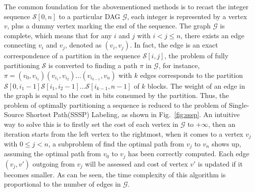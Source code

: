 \documentclass[runningheads,a4paper]{llncs}
\begin{document}
The common foundation for the abovementioned methods is to recast the integer sequence $\mathcal{S} \left[ 0, n \right]$ to a particular DAG $\mathcal{G}$, each integer is represented by a vertex $ v $, plus a dummy vertex marking the end of the sequence.
The graph $\mathcal{G}$ is complete, which means that for any $i$ and $j$ with $i < j \leqslant n$, there exists an edge connecting $v_{i}$ and $v_{j}$, denoted as $\left( v_{i}, v_{j} \right)$.
In fact, the edge is an exact correspondence of a partition in the sequence $\mathcal{S}\left[i, j \right] $, the problem of fully partitioning $\mathcal{S}$ is converted to finding a path $\pi$ in $\mathcal{G}$, for instance, $\pi=\left( v_{0}, v_{i_{1}} \right) \left( v_{i_{1}}, v_{i_{2}} \right)\ldots\left( v_{i_{k-1}}, v_{n} \right)$ with $k$ edges corresponds to the partition $\mathcal{S}\left[0, i_{1}-1 \right]\mathcal{S}\left[i_{1}, i_{2}-1 \right] \ldots\mathcal{S}\left[i_{k-1}, n-1\right] $ of $k$ blocks.
The weight of an edge in the graph is equal to the cost in bits consumed by the partition.
Thus, the problem of optimally partitioning a sequence is reduced to the problem of Single-Source Shortest Path(SSSP) Labeling, as shown in Fig.~\ref{fig:sssp}.
An intuitive way to solve this is to firstly set the cost of each vertex in $\mathcal{G}$ to $+\infty$, then an iteration starts from the left vertex to the rightmost, when it comes to a vertex $v_{j}$ with $0\leqslant j < n$, a subproblem of find the optimal path from $v_{j}$ to $v_{n}$ shows up, assuming the optimal path from $v_{0}$ to $v_{j}$ has been correctly computed.
Each edge $\left( v_{j}, v' \right)$ outgoing from $v_{j}$ will be assessed and cost of vertex $v'$ is updated if it becomes smaller.
As can be seen, the time complexity of this algorithm is proportional to the number of edges in $\mathcal{G}$.
\end{document}
